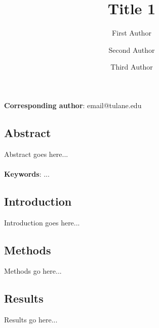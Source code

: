 \documentclass[12pt]{article}
\begin{document}
\setcounter{page}{1}

\title{Title 1}

\author[a]{First Author}
\author[b]{Second Author}
\author[b]{Third Author}


\maketitle

\noindent \textbf{Corresponding author}:  email@tulane.edu 


\thispagestyle{empty}

\vspace{-1cm}



\clearpage





\thispagestyle{fancy}
\subsection*{Abstract}

Abstract goes here...


\paragraph*{}
\noindent \textbf{Keywords}: ...  







\clearpage

\subsection*{Introduction}

Introduction goes here...

\subsection*{Methods}

Methods go here...

\subsection*{Results}

Results go here...
\end{document}
